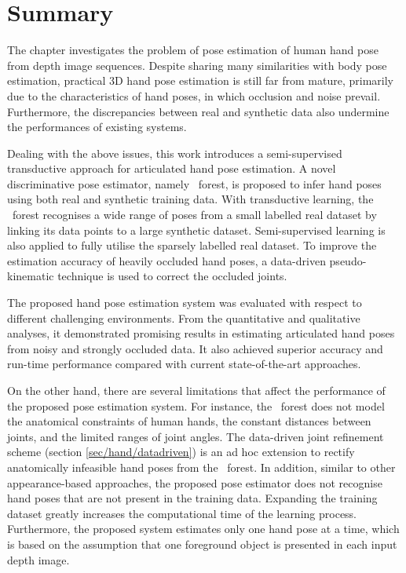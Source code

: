 \section{Summary}

The chapter investigates the problem of pose estimation of human hand pose from depth image sequences. 
Despite sharing many similarities with body pose estimation, practical 3D hand pose estimation is still far from mature, primarily due to the characteristics of hand poses, in which occlusion and noise prevail. 
Furthermore, the discrepancies between real and synthetic data also undermine the performances of existing systems. 

Dealing with the above issues, this work introduces a semi-supervised transductive approach for articulated hand pose estimation. A novel discriminative pose estimator, namely \STR\ forest, is proposed to infer hand poses using both real and synthetic training data. 
With transductive learning, the \STR\ forest recognises a wide range of poses from a small labelled real dataset by linking its data points to a large synthetic dataset.
Semi-supervised learning is also applied to fully utilise the sparsely labelled real dataset. 
To improve the estimation accuracy of heavily occluded hand poses, a data-driven pseudo-kinematic technique is used to correct the occluded joints.  

The proposed hand pose estimation system was evaluated with respect to different challenging environments. From the quantitative and qualitative analyses, it demonstrated promising results in estimating articulated hand poses from noisy and strongly occluded data. It also achieved superior accuracy and run-time performance compared with current state-of-the-art approaches. 

On the other hand, there are several limitations that affect the performance of the proposed pose estimation system. 
For instance, the \STR\ forest does not model the anatomical constraints of human hands, \eg the constant distances between joints, and the limited ranges of joint angles. The data-driven joint refinement scheme (section \ref{sec/hand/datadriven}) is an ad hoc extension to rectify anatomically infeasible hand poses from the \STR\ forest. In addition, similar to other appearance-based approaches, the proposed pose estimator does not recognise hand poses that are not present in the training data. Expanding the training dataset greatly increases the computational time of the learning process. 
Furthermore, the proposed system estimates only one hand pose at a time, which is based on the assumption that one foreground object is presented in each input depth image.    
